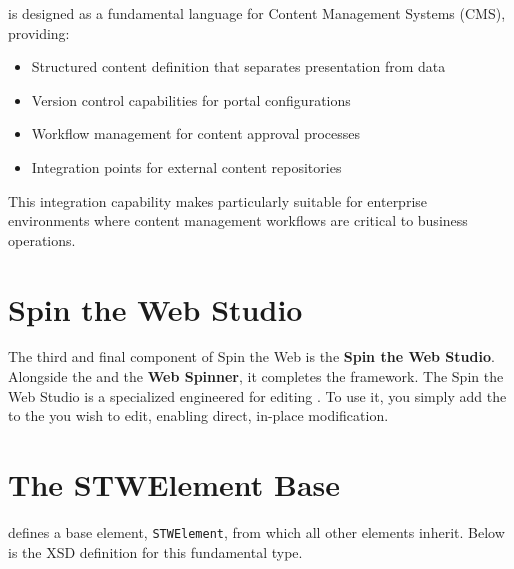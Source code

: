 \wbdl{} is designed as a fundamental language for Content Management Systems (CMS), providing:

\begin{itemize}
\item Structured content definition that separates presentation from data
\item Version control capabilities for portal configurations
\item Workflow management for content approval processes
\item Integration points for external content repositories
\end{itemize}

This integration capability makes \wbdl{} particularly suitable for enterprise environments where content management workflows are critical to business operations.

\section{Spin the Web Studio}
\label{sec:studio}

The third and final component of Spin the Web is the \textbf{Spin the Web Studio}. Alongside the \textbf{\wbdl{}} and the \textbf{Web Spinner}, it completes the framework. The Spin the Web Studio is a specialized \webbaselet{} engineered for editing . To use it, you simply add the \webbaselet{} to the \webbase{} you wish to edit, enabling direct, in-place modification.

\section{The STWElement Base}
\label{sec:stwelement-base}

\wbdl{} defines a base element, \texttt{STWElement}, from which all other elements inherit. Below is the XSD definition for this fundamental type.

